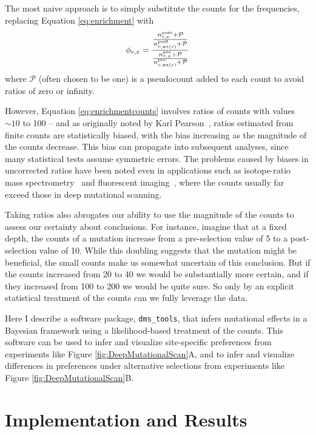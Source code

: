 \documentclass[twocolumn]{bmcart}%
\begin{document}
The most naive approach is to simply substitute the counts for the frequencies, replacing Equation \ref{eq:enrichment} with
\begin{equation}
\label{eq:enrichmentcounts}
\phi_{r,x} = \frac{\frac{n_{r,x}^{\rm{post}} + \mathcal{P}}{n_{r,\operatorname{wt}\left(r\right)}^{\rm{post}} + \mathcal{P}}}{\frac{n_{r,x}^{\rm{pre}} + \mathcal{P}}{n_{r,\operatorname{wt}\left(r\right)}^{\rm{pre}} + \mathcal{P}}}
\end{equation}
where $\mathcal{P}$ (often chosen to be one) is a pseudocount added to each count to avoid ratios of zero or infinity.

However, Equation \ref{eq:enrichmentcounts} involves ratios of counts with values $\sim 10$ to 100 -- and as originally noted by Karl Pearson~\cite{pearson1896mathematical,pearson1910}, ratios estimated from finite counts are statistically biased, with the bias increasing as the magnitude of the counts decrease. This bias can propagate into subsequent analyses, since many statistical tests assume symmetric errors. The problems caused by biases in uncorrected ratios have been noted even in applications such as isotope-ratio mass spectrometry~\cite{ogliore2011} and fluorescent imaging~\cite{van2000mean}, where the counts usually far exceed those in deep mutational scanning.

Taking ratios also abrogates our ability to use the magnitude of the counts to assess our certainty about conclusions. For instance, imagine that at a fixed depth, the counts of a mutation increase from a pre-selection value of 5 to a post-selection value of 10. While this doubling suggests that the mutation might be beneficial, the small counts make us somewhat uncertain of this conclusion. But if the counts increased from 20 to 40 we would be substantially more certain, and if they increased from 100 to 200 we would be quite sure. So only by an explicit statistical treatment of the counts can we fully leverage the data.

Here I describe a software package, \texttt{dms\_tools}, that infers mutational effects in a Bayesian framework using a likelihood-based treatment of the counts. This software can be used to infer and visualize site-specific preferences from experiments like Figure \ref{fig:DeepMutationalScan}A, and to infer and visualize differences in preferences under alternative selections from experiments like Figure \ref{fig:DeepMutationalScan}B. 

\section*{Implementation and Results}
\end{document}
